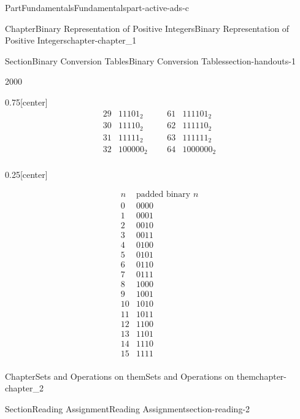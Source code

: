 \documentclass[oneside,10pt,]{book}
\numberwithin{equation}{section}
\begin{document}
\begin{partptx}{Part}{Fundamentals}{}{Fundamentals}{}{}{part-active-ads-c}
\begin{chapterptx}{Chapter}{Binary Representation of Positive Integers}{}{Binary Representation of Positive Integers}{}{}{chapter-chapter_1}
\begin{sectionptx}{Section}{Binary Conversion Tables}{}{Binary Conversion Tables}{}{}{section-handouts-1}
\begin{sidebyside}{2}{0}{0}{0}
\begin{sbspanel}{0.75}[center]
\begin{equation*}
\begin{array}{ccccc}
29 & 11101_2 & \text{     } &
61 & 111101_2 \\
30 & 11110_2 & \text{     } &
62 & 111110_2 \\
31 & 11111_2 & \text{     } &
63 & 111111_2 \\
32 & 100000_2 & \text{     }
& 64 & 1000000_2 \\
\end{array}
\end{equation*}
%
\end{sbspanel}%
\begin{sbspanel}{0.25}[center]%
\par
%
\begin{equation*}
\begin{array}{cc}
n & \text{padded
binary } n \\
0 & 0000 \\
1 & 0001 \\
2 & 0010 \\
3 & 0011 \\
4 & 0100 \\
5 & 0101 \\
6 & 0110 \\
7 & 0111 \\
8 & 1000 \\
9 & 1001 \\
10 & 1010 \\
11 & 1011 \\
12 & 1100 \\
13 & 1101 \\
14 & 1110 \\
15 & 1111 \\
\end{array}
\end{equation*}
%
\end{sbspanel}%
\end{sidebyside}%
\end{sectionptx}
\end{chapterptx}
%
\typeout{************************************************}
\typeout{************************************************}
%
\begin{chapterptx}{Chapter}{Sets and Operations on them}{}{Sets and Operations on them}{}{}{chapter-chapter_2}
\renewcommand*{\chaptername}{Chapter}
%
%
%
\typeout{************************************************}
\typeout{************************************************}
%
\begin{sectionptx}{Section}{Reading Assignment}{}{Reading Assignment}{}{}{section-reading-2}

\end{sectionptx}
\end{chapterptx}
\end{partptx}
\end{document}
